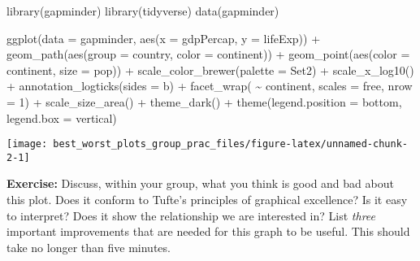 \documentclass[
]{article}
\newenvironment{Shaded}{\begin{snugshade}}{\end{snugshade}}
\newcommand{\AttributeTok}[1]{\textcolor[rgb]{0.77,0.63,0.00}{#1}}
\newcommand{\DecValTok}[1]{\textcolor[rgb]{0.00,0.00,0.81}{#1}}
\newcommand{\FunctionTok}[1]{\textcolor[rgb]{0.00,0.00,0.00}{#1}}
\newcommand{\NormalTok}[1]{#1}
\newcommand{\SpecialCharTok}[1]{\textcolor[rgb]{0.00,0.00,0.00}{#1}}
\newcommand{\StringTok}[1]{\textcolor[rgb]{0.31,0.60,0.02}{#1}}
\begin{document}
\begin{Shaded}
\begin{Highlighting}[]
\FunctionTok{library}\NormalTok{(gapminder)}
\FunctionTok{library}\NormalTok{(tidyverse)}
\FunctionTok{data}\NormalTok{(gapminder)}

\FunctionTok{ggplot}\NormalTok{(}\AttributeTok{data =}\NormalTok{ gapminder,}
       \FunctionTok{aes}\NormalTok{(}\AttributeTok{x =}\NormalTok{ gdpPercap, }\AttributeTok{y =}\NormalTok{ lifeExp)) }\SpecialCharTok{+}
  \FunctionTok{geom\_path}\NormalTok{(}\FunctionTok{aes}\NormalTok{(}\AttributeTok{group =}\NormalTok{ country, }\AttributeTok{color =}\NormalTok{ continent)) }\SpecialCharTok{+}
  \FunctionTok{geom\_point}\NormalTok{(}\FunctionTok{aes}\NormalTok{(}\AttributeTok{color =}\NormalTok{ continent, }\AttributeTok{size =}\NormalTok{ pop)) }\SpecialCharTok{+}
  \FunctionTok{scale\_color\_brewer}\NormalTok{(}\AttributeTok{palette =} \StringTok{\textquotesingle{}Set2\textquotesingle{}}\NormalTok{) }\SpecialCharTok{+} \FunctionTok{scale\_x\_log10}\NormalTok{() }\SpecialCharTok{+}
  \FunctionTok{annotation\_logticks}\NormalTok{(}\AttributeTok{sides =} \StringTok{\textquotesingle{}b\textquotesingle{}}\NormalTok{) }\SpecialCharTok{+}
  \FunctionTok{facet\_wrap}\NormalTok{( }\SpecialCharTok{\textasciitilde{}}\NormalTok{ continent, }\AttributeTok{scales =} \StringTok{\textquotesingle{}free\textquotesingle{}}\NormalTok{, }\AttributeTok{nrow =} \DecValTok{1}\NormalTok{) }\SpecialCharTok{+}
  \FunctionTok{scale\_size\_area}\NormalTok{() }\SpecialCharTok{+}
  \FunctionTok{theme\_dark}\NormalTok{() }\SpecialCharTok{+}
  \FunctionTok{theme}\NormalTok{(}\AttributeTok{legend.position =} \StringTok{\textquotesingle{}bottom\textquotesingle{}}\NormalTok{,}
        \AttributeTok{legend.box =} \StringTok{\textquotesingle{}vertical\textquotesingle{}}\NormalTok{)}
\end{Highlighting}
\end{Shaded}

\begin{center}\texttt{[image: best\_worst\_plots\_group\_prac\_files/figure-latex/unnamed-chunk-2-1]} \end{center}

\normalsize

\normalsize

\textbf{Exercise:} Discuss, within your group, what you think is good
and bad about this plot. Does it conform to Tufte's principles of
graphical excellence? Is it easy to interpret? Does it show the
relationship we are interested in? List \emph{three} important
improvements that are needed for this graph to be useful. This should
take no longer than five minutes.
\end{document}
